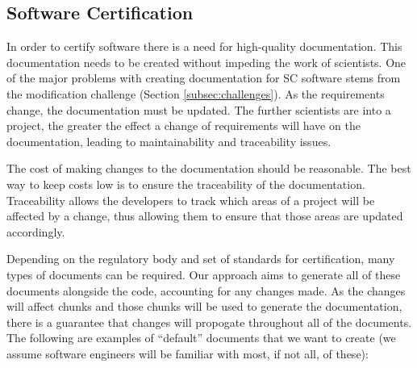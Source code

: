 \documentclass[10pt, preprint]{sigplanconf}
\begin{document}


\subsection{Software Certification}
\label{subsec:software}

In order to certify software there is a need for high-quality documentation. This documentation needs to be created without impeding the work of scientists. One of the major problems with creating documentation for SC software stems from the modification challenge (Section \ref{subsec:challenges}). As the requirements change, the documentation must be updated. The further scientists are into a project, the greater the effect a change of requirements will have on the documentation, leading to maintainability and traceability issues.

The cost of making changes to the documentation should be reasonable. The best way to keep costs low is to ensure the traceability of the documentation. Traceability allows the developers to track which areas of a project will be affected by a change, thus allowing them to ensure that those areas are updated accordingly.

Depending on the regulatory body and set of standards for certification, many types of documents can be required. Our approach aims to generate all of these documents alongside the code, accounting for any changes made. As the changes will affect chunks and those chunks will be used to generate the documentation, there is a guarantee that changes will propogate throughout all of the documents. The following are examples of ``default'' documents that we want to create (we assume software engineers will be familiar with most, if not all, of these):
\end{document}
